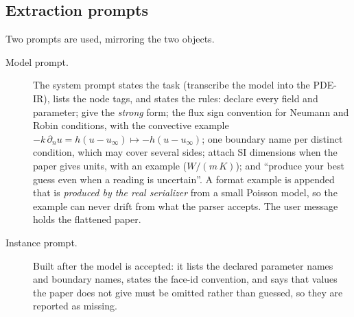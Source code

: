 \subsection{Extraction prompts}
Two prompts are used, mirroring the two objects.
\begin{description}
\item[Model prompt.] The system prompt states the task (transcribe the model into the PDE-IR), lists the node tags, and states the rules: declare every field and parameter; give the \emph{strong} form; the flux sign convention for Neumann and Robin conditions, with the convective example $-k\,\partial_nu=h(u-u_\infty)\mapsto-h(u-u_\infty)$; one boundary name per distinct condition, which may cover several sides; attach SI dimensions when the paper gives units, with an example ($W/(m\,K)$); and ``produce your best guess even when a reading is uncertain''. A format example is appended that is \emph{produced by the real serializer} from a small Poisson model, so the example can never drift from what the parser accepts. The user message holds the flattened paper.
\item[Instance prompt.] Built after the model is accepted: it lists the declared parameter names and boundary names, states the face-id convention, and says that values the paper does not give must be omitted rather than guessed, so they are reported as missing.
\end{description}

